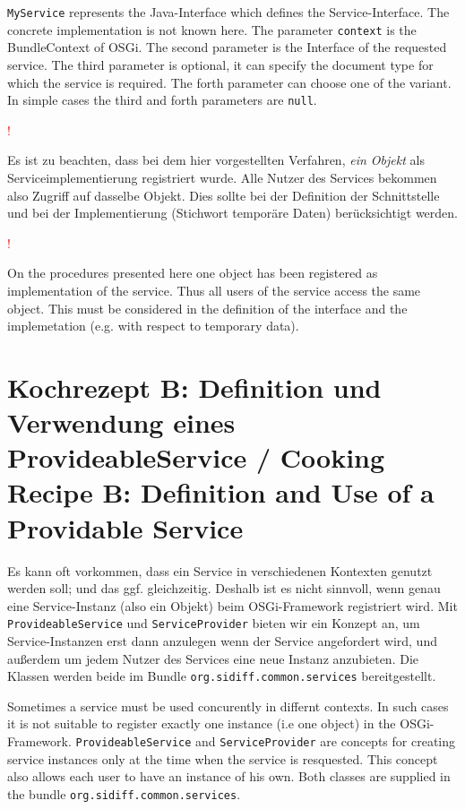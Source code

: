 \documentclass[10pt,a4paper]{scrartcl}
\newcommand{\hinweis}[1]{
\begin{framed}
\begin{minipage}[t]{0.02\textwidth}
\textcolor{red}{\Huge{\sffamily !}}
\end{minipage}
\begin{minipage}[t]{0.94\textwidth}
#1
\end{minipage}
\end{framed}
}
\providecommand{\deng}[2]{#1 / {\sffamily #2}}
\providecommand{\deutsch}[1]{#1}
\providecommand{\englisch}[1]{{\sffamily #1}}
\begin{document}
\englisch{\texttt{MyService} represents the Java-Interface which defines the
Service-Interface. The concrete implementation is not known here. The parameter
\texttt{context} is the BundleContext of OSGi. The second parameter is the
Interface of the requested service. The third parameter is optional, it can
specify the document type for which the service is required. The forth parameter
can choose one of the variant. In simple cases the third and forth parameters
are \texttt{null}.}

\deutsch{\hinweis{Es ist zu beachten, dass bei dem hier vorgestellten Verfahren,
\emph{ein Objekt} als Serviceimplementierung registriert wurde. Alle Nutzer des
Services bekommen also Zugriff auf dasselbe Objekt. Dies sollte bei der
Definition der Schnittstelle und bei der Implementierung (Stichwort temporäre
Daten) berücksichtigt werden.}}

\englisch{\hinweis{On the procedures presented here one object has been
registered as implementation of the service. Thus all users of the service
access the same object. This must be considered in the definition of the
interface and the implemetation (e.g. with respect to temporary data).}}



\clearpage
\section{\deng{Kochrezept B: Definition und Verwendung eines ProvideableService}{Cooking Recipe B: Definition and Use of a Providable Service}}
\deutsch{Es kann oft vorkommen, dass ein Service in verschiedenen Kontexten genutzt
werden soll; und das ggf. gleichzeitig. Deshalb ist es nicht sinnvoll, wenn
genau eine Service-Instanz (also ein Objekt) beim OSGi-Framework registriert
wird. Mit \texttt{ProvideableService} und \texttt{ServiceProvider} bieten wir
ein Konzept an, um Service-Instanzen erst dann anzulegen wenn der Service
angefordert wird, und außerdem um jedem Nutzer des Services eine neue Instanz
anzubieten. Die Klassen werden beide im Bundle \texttt{org.sidiff.common.services}
bereitgestellt.}

\englisch{Sometimes a service must be used concurently in differnt contexts. In
such cases it is not suitable to register exactly one instance (i.e one object)
in the OSGi-Framework. \texttt{ProvideableService} and \texttt{ServiceProvider} 
are concepts for creating service instances only at the time when the service is
resquested. This concept also allows each user to have an instance of his own.
Both classes are supplied in the bundle \texttt{org.sidiff.common.services}.}
\end{document}
